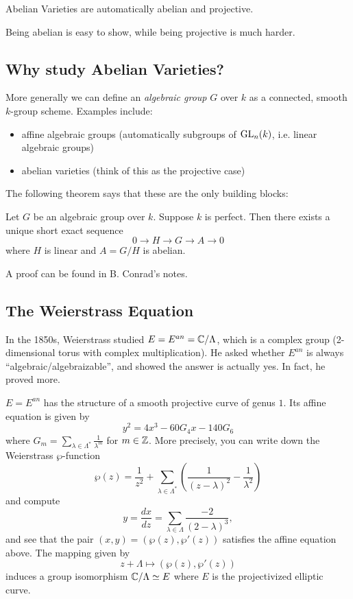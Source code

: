 \begin{theorem}
Abelian Varieties are automatically abelian and projective.
\end{theorem}

Being abelian is easy to show, while being projective is much harder.

\subsection{Why study Abelian Varieties?}

More generally we can define an \emph{algebraic group} $G$ over $k$ as a connected, smooth $k$-group scheme. Examples include:
\begin{itemize}
\item affine algebraic groups (automatically subgroups of $\operatorname{GL}_n(k)$, i.e. linear algebraic groups)
\item abelian varieties (think of this as the projective case)
\end{itemize}

The following theorem says that these are the only building blocks:

\begin{theorem}
Let $G$ be an algebraic group over $k$. Suppose $k$ is perfect. Then there exists a unique short exact sequence 
$$0\to H \to G \to A \to 0$$
where $H$ is linear and $A=G/H$ is abelian. 
\end{theorem}

A proof can be found in B. Conrad's notes. 

\subsection{The Weierstrass Equation}
In the 1850s, Weierstrass studied $E=E^{an}={\mathbb C}/\Lambda$, which is a complex group (2-dimensional torus with complex multiplication). He asked whether $E^{an}$ is always ``algebraic/algebraizable'', and showed the answer is actually yes. In fact, he proved more. 

\begin{theorem}
$E=E^{an}$ has the structure of a smooth projective curve of genus $1$. Its affine equation is given by 
$$y^2=4x^3-60G_4x-140G_6$$
where $G_m=\sum_{\lambda\in\Lambda^*} \frac{1}{\lambda^m}$ for $m\in {\mathbb Z}$. More precisely, you can write down the Weierstrass $\wp$-function
$$\wp(z)=\frac{1}{z^2}+\sum_{\lambda\in\Lambda^*}\left(\frac{1}{(z-\lambda)^2}-\frac{1}{\lambda^2}\right)$$
and compute
$$y=\frac{dx}{dz}=\sum_{\lambda\in \Lambda} \frac{-2}{(2-\lambda)^3},$$
and see that the pair $(x,y)=(\wp(z),\wp'(z))$ satisfies the affine equation above. The mapping given by 
$$z+\Lambda\mapsto (\wp(z),\wp'(z))$$ induces a group isomorphism ${\mathbb C}/\Lambda\simeq E$ where $E$ is the projectivized elliptic curve.
\end{theorem}



